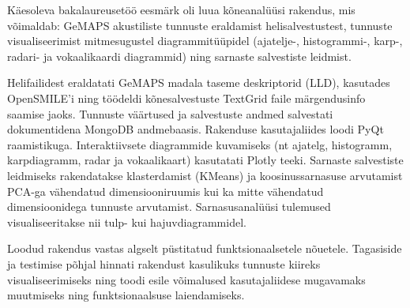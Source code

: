 Käesoleva bakalaureusetöö eesmärk oli luua kõneanalüüsi rakendus, mis võimaldab:
GeMAPS akustiliste tunnuste eraldamist helisalvestustest,
tunnuste visualiseerimist mitmesugustel diagrammitüüpidel (ajatelje-, histogrammi-, karp-, radari- ja vokaalikaardi diagrammid) ning
sarnaste salvestiste leidmist.

Helifailidest eraldatati GeMAPS madala taseme deskriptorid (LLD), kasutades OpenSMILE’i ning töödeldi kõnesalvestuste TextGrid faile märgendusinfo saamise jaoks. Tunnuste väärtused ja salvestuste andmed salvestati dokumentidena MongoDB andmebaasis.
Rakenduse kasutajaliides loodi PyQt raamistikuga. Interaktiivsete diagrammide kuvamiseks (nt ajatelg, histogramm, karpdiagramm, radar ja vokaalikaart) kasutatati Plotly teeki.
Sarnaste salvestiste leidmiseks rakendatakse klasterdamist (KMeans) ja koosinussarnasuse arvutamist PCA-ga vähendatud dimensiooniruumis kui ka mitte vähendatud dimensioonidega tunnuste arvutamist. Sarnasusanalüüsi tulemused visualiseeritakse nii tulp- kui hajuvdiagrammidel.

Loodud rakendus vastas algselt püstitatud funktsionaalsetele nõuetele. Tagasiside ja testimise põhjal hinnati rakendust kasulikuks tunnuste kiireks visualiseerimiseks ning toodi esile võimalused kasutajaliidese mugavamaks muutmiseks ning funktsionaalsuse laiendamiseks.
